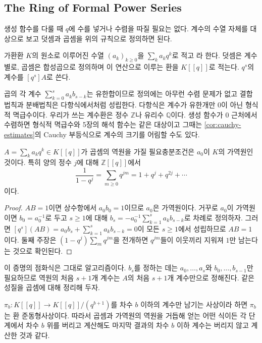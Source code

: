 \subsection{The Ring of Formal Power Series}

생성 함수를 다룰 때 $q$에 수를 넣거나 수렴을 따질 필요는 없다. 계수의 수열 자체를 대상으로 보고 덧셈과 곱셈을 위의 규칙으로 정의하면 된다.

\begin{definition}
\label{def:formal-power-series}
가환환 $K$의 원소로 이루어진 수열 $(a_k)_{k\ge0}$을 $\sum_ka_kq^k$로 적고 라 한다. 덧셈은 계수별로, 곱셈은 합성곱으로 정의하며 이 연산으로 이루는 환을 $K[[q]]$로 적는다. $q^s$의 계수를 $[q^s]A$로 쓴다.
\end{definition}

곱의 각 계수 $\sum_{k=0}^sa_kb_{s-k}$는 유한합이므로 정의에는 아무런 수렴 문제가 없고 결합법칙과 분배법칙은 다항식에서처럼 성립한다. 다항식은 계수가 유한개만 $0$이 아닌 형식적 멱급수이다. 우리가 쓰는 계수환은 정수 $\mathbb Z$나 유리수 $\mathbb Q$이다. 생성 함수가 $0$ 근처에서 수렴하면 형식적 멱급수와 5장의 해석 함수는 같은 대상이고 그때는 \cref{cor:cauchy-estimates}의 Cauchy 부등식으로 계수의 크기를 어림할 수도 있다.

\begin{proposition}
\label{prop:fps-inverse}
$A=\sum_ka_kq^k\in K[[q]]$가 곱셈의 역원을 가질 필요충분조건은 $a_0$이 $K$의 가역원인 것이다. 특히 양의 정수 $j$에 대해 $\mathbb Z[[q]]$에서
\[
\frac1{1-q^j}=\sum_{m\ge0}q^{jm}=1+q^j+q^{2j}+\cdots
\]
이다.
\end{proposition}

\begin{proof}
$AB=1$이면 상수항에서 $a_0b_0=1$이므로 $a_0$은 가역원이다. 거꾸로 $a_0$이 가역원이면 $b_0=a_0^{-1}$로 두고 $s\ge1$에 대해 $b_s=-a_0^{-1}\sum_{k=1}^sa_kb_{s-k}$로 차례로 정의하자. 그러면 $[q^s](AB)=a_0b_s+\sum_{k=1}^sa_kb_{s-k}=0$이 모든 $s\ge1$에서 성립하므로 $AB=1$이다. 둘째 주장은 $(1-q^j)\sum_mq^{jm}$을 전개하면 $q^{jm}$들이 이웃끼리 지워져 $1$만 남는다는 것으로 확인된다.
\end{proof}

이 증명의 점화식은 그대로 알고리즘이다. $b_s$를 정하는 데는 $a_0,\dots,a_s$와 $b_0,\dots,b_{s-1}$만 필요하므로 역원의 처음 $s+1$개 계수는 $A$의 처음 $s+1$개 계수만으로 정해진다. 같은 성질을 곱셈에 대해 정리해 두자.

\begin{proposition}
\label{prop:fps-truncate}
$\pi_b:K[[q]]\to K[[q]]/(q^{b+1})$를 차수 $b$ 이하의 계수만 남기는 사상이라 하면 $\pi_b$는 환 준동형사상이다. 따라서 곱셈과 가역원의 역원을 거듭해 얻는 어떤 식이든 각 단계에서 차수 $b$ 위를 버리고 계산해도 마지막 결과의 차수 $b$ 이하 계수는 버리지 않고 계산한 것과 같다.
\end{proposition}


